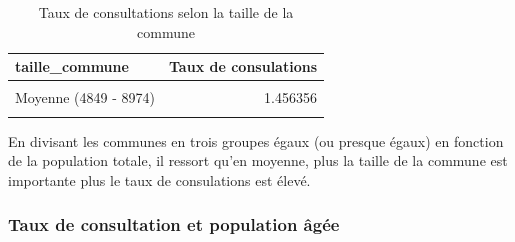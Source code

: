 \documentclass[
]{article}
\begin{document}
\begin{table}[H]
\centering
\caption{\label{tab:unnamed-chunk-7}Taux de consultations selon la taille de la commune}
\centering
\begin{tabular}[t]{lr}
\toprule
taille\_commune & Taux de consulations\\
\midrule
\cellcolor{gray!10}{Grande (> 8974)} & \cellcolor{gray!10}{1.526810}\\
Moyenne (4849 - 8974) & 1.456356\\
\cellcolor{gray!10}{Petite (<= 4848)} & \cellcolor{gray!10}{1.383861}\\
\bottomrule
\end{tabular}
\end{table}

En divisant les communes en trois groupes égaux (ou presque égaux) en
fonction de la population totale, il ressort qu'en moyenne, plus la
taille de la commune est importante plus le taux de consulations est
élevé.

\subsubsection{Taux de consultation et population
âgée}\label{taux-de-consultation-et-population-uxe2guxe9e}
\end{document}
